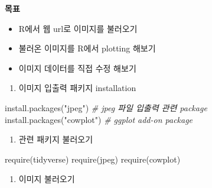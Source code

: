 \documentclass[
  11pt,
]{krantz}
\makeatletter
\newenvironment{Shaded}{\begin{snugshade}}{\end{snugshade}}
\newcommand{\CommentTok}[1]{\textcolor[rgb]{0.37,0.37,0.37}{\textit{#1}}}
\newcommand{\FunctionTok}[1]{\textcolor[rgb]{0,0,0}{#1}}
\newcommand{\NormalTok}[1]{#1}
\newcommand{\StringTok}[1]{\textcolor[rgb]{0.5,0.5,0.5}{#1}}
\providecommand{\tightlist}{%
  \setlength{\itemsep}{0pt}\setlength{\parskip}{0pt}}
\newenvironment{kframe}{%
\medskip{}
\setlength{\fboxsep}{.8em}
 \def\at@end@of@kframe{}%
 \ifinner\ifhmode%
  \def\at@end@of@kframe{\end{minipage}}%
  \begin{minipage}{\columnwidth}%
 \fi\fi%
 \def\FrameCommand##1{\hskip\@totalleftmargin \hskip-\fboxsep
 \colorbox{shadecolor}{##1}\hskip-\fboxsep
     \hskip-\linewidth \hskip-\@totalleftmargin \hskip\columnwidth}%
 \MakeFramed {\advance\hsize-\width
   \@totalleftmargin\z@ \linewidth\hsize
   \@setminipage}}%
 {\par\unskip\endMakeFramed%
 \at@end@of@kframe}
\newenvironment{rmdblock}[1]
  {
  \begin{itemize}
  \renewcommand{\labelitemi}{
    \raisebox{-.7\height}[0pt][0pt]{
      {\setkeys{Gin}{width=3em,keepaspectratio}\texttt{[image: images/\#1]}}
    }
  }
  \setlength{\fboxsep}{1em}
  \begin{kframe}
  \item
  }
  {
  \end{kframe}
  \end{itemize}
  }
\newenvironment{rmdnote}
  {\begin{rmdblock}{note}}
  {\end{rmdblock}}
\makeatother
\begin{document}
\normalsize

\footnotesize

\begin{rmdnote}
\textbf{목표}

\begin{itemize}
\tightlist
\item
  R에서 웹 url로 이미지를 불러오기
\item
  불러온 이미지를 R에서 plotting 해보기
\item
  이미지 데이터를 직접 수정 해보기
\end{itemize}
\end{rmdnote}

\normalsize

\begin{enumerate}
\def\labelenumi{\arabic{enumi}.}
\tightlist
\item
  이미지 입출력 패키지 installation
\end{enumerate}

\footnotesize

\begin{Shaded}
\begin{Highlighting}[]
\FunctionTok{install.packages}\NormalTok{(}\StringTok{"jpeg"}\NormalTok{) }\CommentTok{\# jpeg 파일 입출력 관련 package}
\FunctionTok{install.packages}\NormalTok{(}\StringTok{"cowplot"}\NormalTok{) }\CommentTok{\# ggplot add{-}on package}
\end{Highlighting}
\end{Shaded}

\normalsize

\begin{enumerate}
\def\labelenumi{\arabic{enumi}.}
\setcounter{enumi}{1}
\tightlist
\item
  관련 패키지 불러오기
\end{enumerate}

\footnotesize

\begin{Shaded}
\begin{Highlighting}[]
\FunctionTok{require}\NormalTok{(tidyverse)}
\FunctionTok{require}\NormalTok{(jpeg)}
\FunctionTok{require}\NormalTok{(cowplot)}
\end{Highlighting}
\end{Shaded}

\normalsize

\begin{enumerate}
\def\labelenumi{\arabic{enumi}.}
\setcounter{enumi}{2}
\tightlist
\item
  이미지 불러오기
\end{enumerate}
\end{document}
